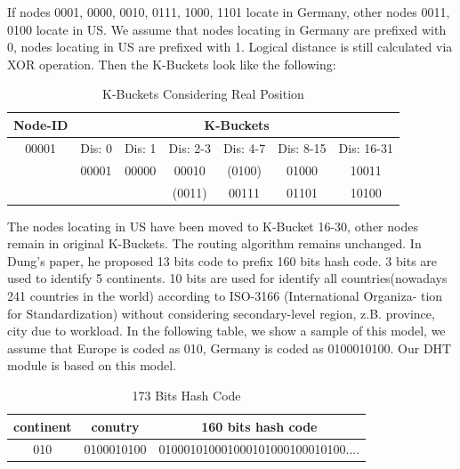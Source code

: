 \documentclass[12pt,oneside,a4paper]{article}
\begin{document}
If nodes 0001, 0000, 0010, 0111, 1000, 1101 locate in Germany, other nodes 0011, 0100 locate in US. We assume that nodes locating in Germany are prefixed with 0, nodes locating in US are prefixed with 1. Logical distance is still calculated via XOR operation. Then the K-Buckets look like the following:
\begin{table}[!h]
\centering
\caption{K-Buckets Considering Real Position}
\label{my-label2}
\begin{tabular}{|c|c|c|c|c|c|c|}
\hline
\multicolumn{1}{|l|}{Node-ID} & \multicolumn{6}{c|}{K-Buckets}                                                                                                                                                                                             \\ \hline
{\color[HTML]{333333} 00001}  & \multicolumn{1}{l|}{Dis: 0} & \multicolumn{1}{l|}{Dis: 1} & \multicolumn{1}{l|}{Dis: 2-3} & \multicolumn{1}{l|}{Dis: 4-7} & \multicolumn{1}{l|}{Dis: 8-15} & \multicolumn{1}{l|}{Dis: 16-31} \\ \hline
                              & 00001                            & 00000                            & 00010                              & \cellcolor[HTML]{FFFFC7}(0100)     & 01000                               & \cellcolor[HTML]{9AFF99}10011        \\ \hline
                              &                                  &                                  & \cellcolor[HTML]{FFFFC7}(0011)     & 00111                              & 01101                               & \cellcolor[HTML]{9AFF99}10100        \\ \hline
\end{tabular}
\end{table}
The nodes locating in US have been moved to K-Bucket 16-30, other nodes remain in original K-Buckets. The routing algorithm remains unchanged. In Dung's paper, he proposed 13 bits code to prefix 160 bits hash code. 3 bits are used to identify 5 continents. 10 bits are used for identify all countries(nowadays 241 countries in the world) according to ISO-3166 (International Organiza- tion for Standardization) without considering secondary-level region, z.B. province, city due to workload. In the following table, we show a sample of this model, we assume that Europe is coded as 010, Germany is coded as 0100010100. Our DHT module is based on this model.
\begin{table}[!h]
\centering
\caption{173 Bits Hash Code}
\label{my-label}
\begin{tabular}{|c|c|c|}
\hline
continent & conutry    & 160 bits hash code                 \\ \hline
010       & 0100010100 & 010001010001000101000100010100.... \\ \hline
\end{tabular}
\end{table}
\end{document}
